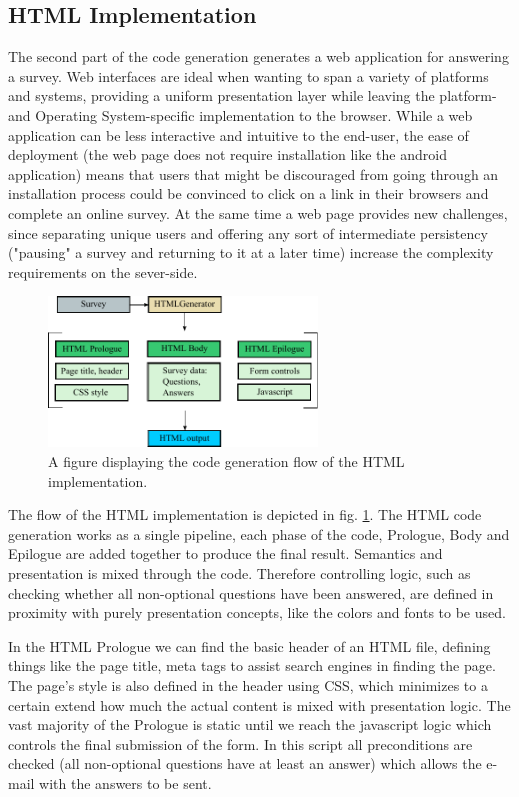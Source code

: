\documentclass[runningheads]{llncs}
\begin{document}
\subsection {HTML Implementation}
The second part of the code generation generates a web application for answering a survey. Web interfaces are ideal when wanting to span a variety of platforms and systems, providing a uniform presentation layer while leaving the platform- and Operating System-specific implementation to the browser. While a web application can be less interactive and intuitive to the end-user, the ease of deployment (the web page does not require installation like the android application) means that users that might be discouraged from going through an installation process could be convinced to click on a link in their browsers and complete an online survey. At the same time a web page provides new challenges, since separating unique users and offering any sort of intermediate persistency ("pausing" a survey and returning to it at a later time) increase the complexity requirements on the sever-side. 
\begin{figure}
\centering
\includegraphics[height=4cm]{htmlgen}
\caption{A figure displaying the code generation flow of the HTML implementation.}
\label{fig:htmlgen}
\end{figure}
The flow of the HTML implementation is depicted in fig. \ref{fig:htmlgen}. The HTML code generation works as a single pipeline, each phase of the code, Prologue, Body and Epilogue are added together to produce the final result. Semantics and presentation is mixed through the code. Therefore controlling logic, such as  checking whether all non-optional questions have been answered, are defined in proximity with purely presentation concepts, like the colors and fonts to be used. 

In the HTML Prologue we can find the basic header of an HTML file, defining things like the page title, meta tags to assist search engines in finding the page. The page's style is also defined in the header using CSS, which minimizes to a certain extend how much the actual content is mixed with presentation logic. The vast majority of the Prologue is static until we reach the javascript logic which controls the final submission of the form. In this script all preconditions are checked (all non-optional questions have at least an answer) which allows the e-mail with the answers to be sent. 
\end{document}
